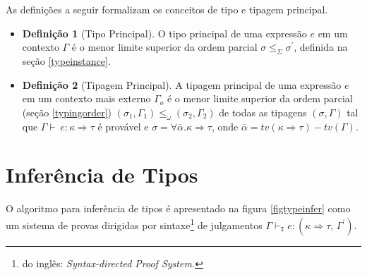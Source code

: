 As defini\c{c}\~oes a seguir formalizam os conceitos de tipo e tipagem principal.

\begin{itemize}
	\item[\ ]\textbf{Defini\c{c}\~ao 1} (Tipo Principal). O tipo principal de uma express\~ao $e$ em um contexto 
	         $\Gamma$ \'e o menor limite superior da ordem parcial $\sigma\leq_{\Sigma}\sigma^{\prime}$, definida na se\c{c}\~ao
	         \ref{typeinstance}.
	\item[\ ]\textbf{Defini\c{c}\~ao 2} (Tipagem Principal). A tipagem principal de uma express\~ao $e$ em um 
	contexto mais externo $\Gamma_{o}$ \'e o menor limite superior da ordem parcial (se\c{c}\~ao \ref{typingorder})
	$(\sigma_{1},\Gamma_{1})\leq_{\omega}(\sigma_{2},\Gamma_{2})$ de todas as tipagens $(\sigma,\Gamma)$ tal que
	$\Gamma\vdash\,e:\kappa\Rightarrow\tau$ \'e prov\'avel e $\sigma=\forall\overline{\alpha}.\kappa\Rightarrow\tau$,
	onde $\overline{\alpha}=tv(\kappa\Rightarrow\tau)-tv(\Gamma)$.
\end{itemize}

\section{Infer\^encia de Tipos}\label{inference}

O algoritmo para infer\^encia de tipos \'e apresentado na figura \ref{figtypeinfer} como um sistema de provas dirigidas
por sintaxe\footnote{do ingl\^es: \emph{Syntax-directed Proof System.}} de julgamentos 
$\Gamma \vdash_{\texttt{I}} e: (\kappa\Rightarrow\tau,\,\Gamma^{\prime})$.


